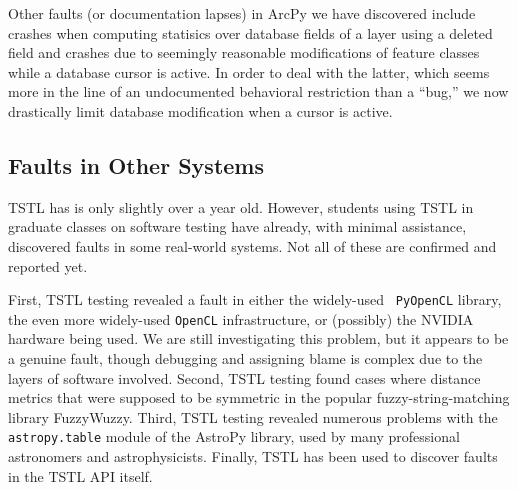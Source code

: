 Other faults (or documentation lapses) in ArcPy we have discovered include crashes when computing
statisics over database fields of a layer using a deleted field and
crashes due to seemingly reasonable modifications of feature classes
while a database cursor is active.  In order to deal with the latter,
which seems more in the line of an undocumented behavioral restriction
than a ``bug,'' we now drastically limit database modification when a cursor is active.

\subsection{Faults in Other Systems}

TSTL has is only slightly over a year old.  However, students using
TSTL in graduate classes on software testing have already, with
minimal assistance, discovered faults in some real-world systems.  Not
all of these are confirmed and reported yet.

First, TSTL testing revealed a fault in either the widely-used {\tt
  PyOpenCL} library, the even more widely-used {\tt OpenCL}
infrastructure, or (possibly) the NVIDIA hardware being used.  We are
still investigating this problem, but it appears to be a genuine
fault, though debugging and assigning blame is complex due to the
layers of software involved.  Second, TSTL testing found cases where distance metrics that were supposed to
be symmetric in the popular fuzzy-string-matching library FuzzyWuzzy.
Third, TSTL testing revealed numerous problems with the {\tt
  astropy.table} module of the AstroPy
library, used by many professional astronomers and astrophysicists.
Finally, TSTL has been used to discover faults in the TSTL API itself.